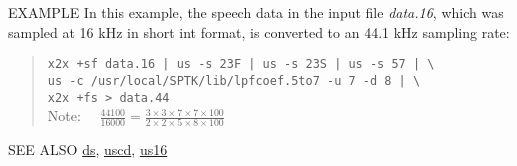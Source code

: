 \begin{qsection}{EXAMPLE}
In this example, the speech data in the input file {\em data.16},
which was sampled at 16 kHz in short int format, is converted to
an 44.1 kHz sampling rate:
\begin{quote}
\verb!x2x +sf data.16 | us -s 23F | us -s 23S | us -s 57 | \! \\
\verb!us -c /usr/local/SPTK/lib/lpfcoef.5to7 -u 7 -d 8 | \! \\
\verb!x2x +fs > data.44! \\ [5mm]
Note:~~
$\displaystyle\frac{44100}{16000} = 
	\frac{3\times3\times7\times7\times100}{2\times2\times5\times8\times100}$
\end{quote}
\end{qsection}


\begin{qsection}{SEE ALSO}
 \hyperlink{ds}{ds},
 \hyperlink{uscd}{uscd},
 \hyperlink{us16}{us16}
\end{qsection}
